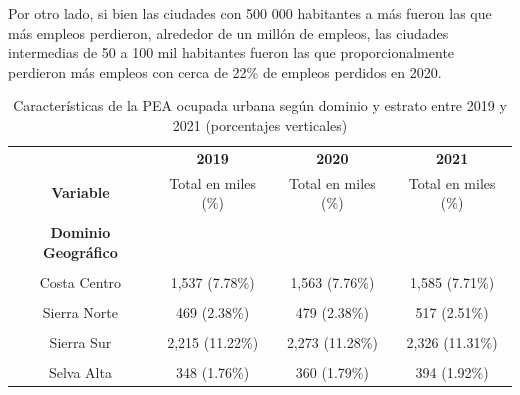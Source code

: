 \documentclass[
  letterpaper,
  12pt,
  oneside,
  spanish,
  doublespacing,
  headsepline,
  parskip]{MastersDoctoralThesis}
\begin{document}
Por otro lado, si bien las ciudades con 500 000 habitantes a más fueron
las que más empleos perdieron, alrededor de un millón de empleos, las
ciudades intermedias de 50 a 100 mil habitantes fueron las que
proporcionalmente perdieron más empleos con cerca de 22\% de empleos
perdidos en 2020.

\hypertarget{tbl-peadomes}{}
\begin{table}[H]
\caption{\label{tbl-peadomes}Características de la PEA ocupada urbana según dominio y estrato entre
2019 y 2021 (porcentajes verticales) }\tabularnewline

\centering\begingroup\fontsize{10}{12}\selectfont

\begin{tabular}{cccc}
\toprule
\multicolumn{1}{c}{ } & \multicolumn{1}{c}{\textbf{2019}} & \multicolumn{1}{c}{\textbf{2020}} & \multicolumn{1}{c}{\textbf{2021}} \\
\cmidrule(l{3pt}r{3pt}){2-2} \cmidrule(l{3pt}r{3pt}){3-3} \cmidrule(l{3pt}r{3pt}){4-4}
\textbf{Variable} & Total en miles (\%) & Total en miles (\%) & Total en miles (\%)\\
\midrule
\cellcolor{gray!6}{\textbf{Nacional}} & \cellcolor{gray!6}{19,747 (100.00\%)} & \cellcolor{gray!6}{20,153 (100.00\%)} & \cellcolor{gray!6}{20,558 (100.00\%)}\\
\textbf{Dominio Geográfico} &  &  & \\
\cellcolor{gray!6}{Costa Norte} & \cellcolor{gray!6}{3,285 (16.64\%)} & \cellcolor{gray!6}{3,349 (16.62\%)} & \cellcolor{gray!6}{3,406 (16.57\%)}\\
Costa Centro & 1,537 (7.78\%) & 1,563 (7.76\%) & 1,585 (7.71\%)\\
\cellcolor{gray!6}{Costa Sur} & \cellcolor{gray!6}{466 (2.36\%)} & \cellcolor{gray!6}{468 (2.32\%)} & \cellcolor{gray!6}{481 (2.34\%)}\\
\addlinespace
Sierra Norte & 469 (2.38\%) & 479 (2.38\%) & 517 (2.51\%)\\
\cellcolor{gray!6}{Sierra Centro} & \cellcolor{gray!6}{1,497 (7.58\%)} & \cellcolor{gray!6}{1,531 (7.59\%)} & \cellcolor{gray!6}{1,554 (7.56\%)}\\
Sierra Sur & 2,215 (11.22\%) & 2,273 (11.28\%) & 2,326 (11.31\%)\\
\cellcolor{gray!6}{Selva Baja} & \cellcolor{gray!6}{1,613 (8.17\%)} & \cellcolor{gray!6}{1,663 (8.25\%)} & \cellcolor{gray!6}{1,653 (8.04\%)}\\
Selva Alta & 348 (1.76\%) & 360 (1.79\%) & 394 (1.92\%)\\

\end{tabular}
\end{table}
\end{document}

